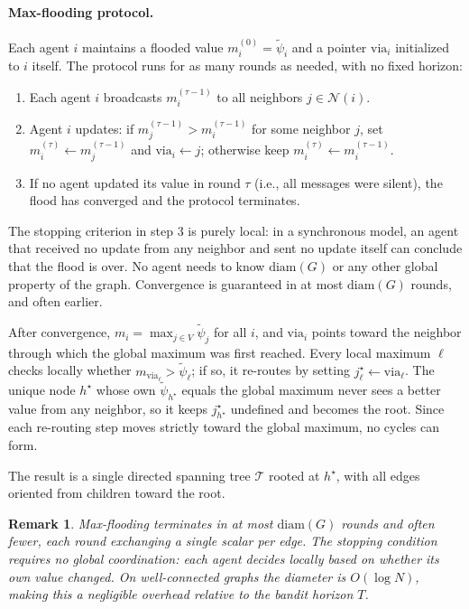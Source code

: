 \documentclass{article}
\newtheorem{remark}{Remark}
\begin{document}
\paragraph{Max-flooding protocol.}
Each agent $i$ maintains a flooded value $m_i^{(0)} = \tilde{\psi}_i$ and a pointer $\mathrm{via}_i$ initialized to $i$ itself. The protocol runs for as many rounds as needed, with no fixed horizon:
\begin{enumerate}
    \item Each agent $i$ broadcasts $m_i^{(\tau-1)}$ to all neighbors $j \in \mathcal{N}(i)$.
    \item Agent $i$ updates: if $m_j^{(\tau-1)} > m_i^{(\tau-1)}$ for some neighbor $j$, set $m_i^{(\tau)} \leftarrow m_j^{(\tau-1)}$ and $\mathrm{via}_i \leftarrow j$; otherwise keep $m_i^{(\tau)} \leftarrow m_i^{(\tau-1)}$.
    \item If no agent updated its value in round $\tau$ (i.e., all messages were silent), the flood has converged and the protocol terminates.
\end{enumerate}
The stopping criterion in step 3 is purely local: in a synchronous model, an agent that received no update from any neighbor and sent no update itself can conclude that the flood is over. No agent needs to know $\mathrm{diam}(G)$ or any other global property of the graph. Convergence is guaranteed in at most $\mathrm{diam}(G)$ rounds, and often earlier.

After convergence, $m_i = \max_{j \in V} \tilde{\psi}_j$ for all $i$, and $\mathrm{via}_i$ points toward the neighbor through which the global maximum was first reached. Every local maximum $\ell$ checks locally whether $m_{\mathrm{via}_\ell} > \tilde{\psi}_\ell$; if so, it re-routes by setting $j_\ell^\star \leftarrow \mathrm{via}_\ell$. The unique node $h^\star$ whose own $\tilde{\psi}_{h^\star}$ equals the global maximum never sees a better value from any neighbor, so it keeps $j_{h^\star}^\star$ undefined and becomes the root. Since each re-routing step moves strictly toward the global maximum, no cycles can form.

The result is a single directed spanning tree $\mathcal{T}$ rooted at $h^\star$, with all edges oriented from children toward the root.

\begin{remark}
Max-flooding terminates in at most $\mathrm{diam}(G)$ rounds and often fewer, each round exchanging a single scalar per edge. The stopping condition requires no global coordination: each agent decides locally based on whether its own value changed. On well-connected graphs the diameter is $O(\log N)$, making this a negligible overhead relative to the bandit horizon $T$.
\end{remark}
\end{document}
